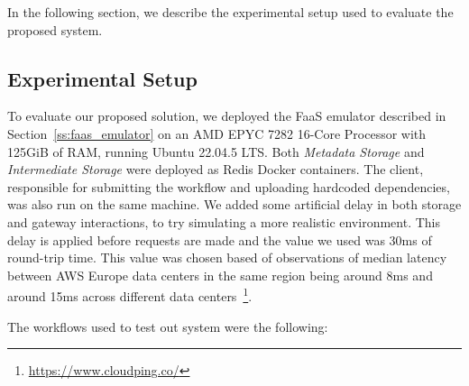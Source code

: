 \documentclass[conference]{IEEEtran}
\begin{document}
In the following section, we describe the experimental setup used to evaluate the proposed system.

\subsection{Experimental Setup}

To evaluate our proposed solution, we deployed the FaaS emulator described in Section~\ref{ss:faas_emulator} on an AMD EPYC 7282 16-Core Processor with 125GiB of RAM, running Ubuntu 22.04.5 LTS. Both \textit{Metadata Storage} and \textit{Intermediate Storage} were deployed as Redis Docker containers. The client, responsible for submitting the workflow and uploading hardcoded dependencies, was also run on the same machine. We added some artificial delay in both storage and gateway interactions, to try simulating a more realistic environment. This delay is applied before requests are made and the value we used was 30ms of round-trip time. This value was chosen based of observations of median latency between AWS Europe data centers in the same region being around 8ms and around 15ms across different data centers~\footnote{\url{https://www.cloudping.co/}}.

The workflows used to test out system were the following:
\end{document}
